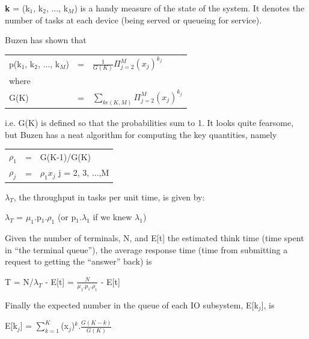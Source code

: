 \documentclass[12pt,fleqn]{report}
\begin{document}
{\bf k} = (k$_1$, k$_2$, ..., k$_M$) is a handy measure of the 
state of the system. It denotes the number of tasks at each device
(being served or queueing for service).

Buzen has shown that 


\begin{center}
\begin{tabular}{l c l}
p(k$_1$, k$_2$, ..., k$_M$)  & = &
  $\frac{1}{G(K)}$$\Pi_{j=2}^{M}(x_j)^{k_j}$\\
where &&\\
G(K)   & = & $\sum_{k \epsilon (K, M)} \Pi_{j=2}^{M}(x_j)^{k_j}$\\
\end{tabular}
\end{center}

\noindent
i.e. G(K) is defined so that the probabilities sum to 1.
It looks quite fearsome, but Buzen has a neat algorithm for
computing the key quantities, namely


\begin{center}
\begin{tabular}{||l c l||}
\hline
$\rho_1$ & = & G(K-1)/G(K)   \\[0.2in]
$\rho_j$ & = & $\rho_1$$x_j$ \hspace*{1in} j = 2, 3, ...,M\\
\hline
\end{tabular}
\end{center}

\noindent
 $\lambda_T$, the throughput in tasks per unit time, is
given by:

\begin{center}
$\lambda_T$ = $\mu_1$.p$_1$.$\rho_1$ 
              (or p$_1$.$\lambda_1$ if we knew $\lambda_1$)
\end{center}

\noindent
Given the number of terminals, N, 
and E[t] the  estimated think time (time spent in ``the terminal queue''),
the average response time (time from submitting a request to getting
the ``answer'' back) is 

\begin{center}
T = N/$\lambda_T$ - E[t] = $\frac{N}{\mu_1.p_1.\rho_1}$ - E[t]
\end{center}

\noindent
Finally the expected number in the queue of each IO subsystem, E[k$_j$],
is 

\begin{center}
E[k$_j$] = $\sum_{k=1}^{K}$(x$_j$)$^k$.$\frac{G(K-k)}{G(K)}$
\end{center}
\end{document}
